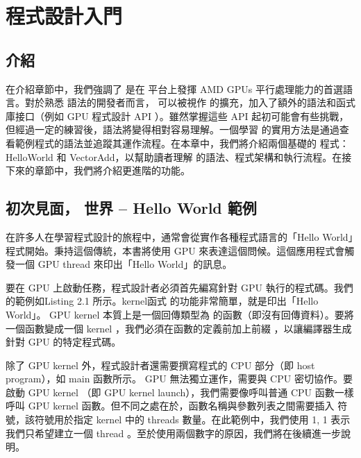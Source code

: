 \titleformat{\subsection}{\large\bfseries\CJKsection}{\thesubsection}{1em}{}

\chapter{  程式設計入門} \label{chap:getting_started_with_hip_programming}
\section{介紹}

在介紹章節中，我們強調了  是在  平台上發揮 AMD GPUs 平行處理能力的首選語言。對於熟悉  語法的開發者而言，  可以被視作  的擴充，加入了額外的語法和函式庫接口（例如 GPU 程式設計 API ）。雖然掌握這些 API 起初可能會有些挑戰，但經過一定的練習後，語法將變得相對容易理解。一個學習  的實用方法是通過查看範例程式的語法並追蹤其運作流程。在本章中，我們將介紹兩個基礎的  程式：HelloWorld 和 VectorAdd，以幫助讀者理解  的語法、程式架構和執行流程。在接下來的章節中，我們將介紹更進階的功能。

\section{初次見面，  世界 -- Hello World 範例}

在許多人在學習程式設計的旅程中，通常會從實作各種程式語言的「Hello World」程式開始。秉持這個傳統，本書將使用 GPU 來表達這個問候。這個應用程式會觸發一個 GPU thread 來印出「Hello World」的訊息。

要在 GPU 上啟動任務，程式設計者必須首先編寫針對 GPU 執行的程式碼。我們的範例如Listing 2.1 所示。kernel函式  的功能非常簡單，就是印出「Hello World」。 GPU kernel 本質上是一個回傳類型為  的函數（即沒有回傳資料）。要將一個函數變成一個 kernel ，我們必須在函數的定義前加上前綴 ，以讓編譯器生成針對 GPU 的特定程式碼。

除了 GPU kernel 外，程式設計者還需要撰寫程式的 CPU 部分（即 host program），如 main 函數所示。 GPU 無法獨立運作，需要與 CPU 密切協作。要啟動 GPU kernel （即 GPU kernel launch），我們需要像呼叫普通 CPU 函數一樣呼叫 GPU kernel 函數。但不同之處在於，函數名稱與參數列表之間需要插入 \code{<<<>>>} 符號，該符號用於指定 kernel 中的 threads 數量。在此範例中，我們使用 1, 1 表示我們只希望建立一個 thread 。至於使用兩個數字的原因，我們將在後續進一步說明。

